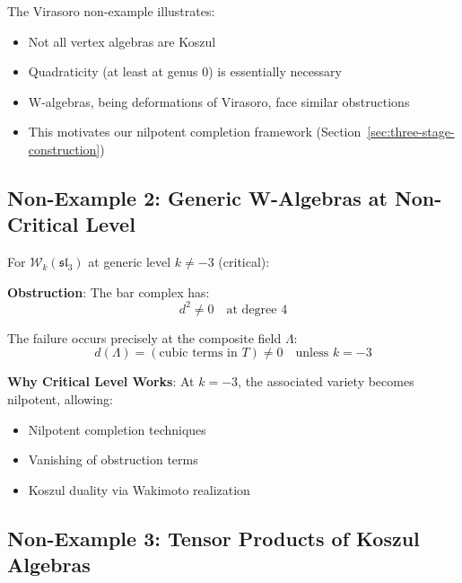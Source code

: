 \begin{remark}
The Virasoro non-example illustrates:
\begin{itemize}
\item Not all vertex algebras are Koszul
\item Quadraticity (at least at genus 0) is essentially necessary
\item W-algebras, being deformations of Virasoro, face similar obstructions
\item This motivates our nilpotent completion framework (Section~\ref{sec:three-stage-construction})
\end{itemize}
\end{remark}

\subsection{Non-Example 2: Generic W-Algebras at Non-Critical Level}

\begin{remark}
For $\mathcal{W}_k(\mathfrak{sl}_3)$ at generic level $k \neq -3$ (critical):

\textbf{Obstruction}: The bar complex has:
\begin{equation}
d^2 \neq 0 \quad \text{at degree 4}
\end{equation}

The failure occurs precisely at the composite field $\Lambda$:
\begin{equation}
d(\Lambda) = (\text{cubic terms in } T) \neq 0 \quad \text{unless } k = -3
\end{equation}

\textbf{Why Critical Level Works}:
At $k = -3$, the associated variety becomes nilpotent, allowing:
\begin{itemize}
\item Nilpotent completion techniques
\item Vanishing of obstruction terms
\item Koszul duality via Wakimoto realization
\end{itemize}
\end{remark}

\subsection{Non-Example 3: Tensor Products of Koszul Algebras}

